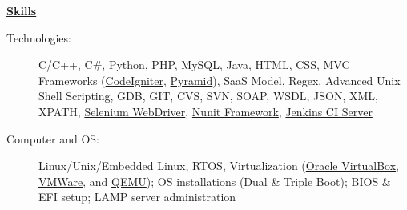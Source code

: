 \documentclass[letterpaper,11pt]{article}
\newcommand{\resheading}[1]{{\large \colorbox{mygrey}{\begin{minipage}{\textwidth}{\textbf{#1 \vphantom{p\^{E}}}}\end{minipage}}}}
\begin{document}
\resheading{\href{http://www.derekhildreth.com/portfolio.php}{Skills}}
	\begin{description}
		\item[Technologies:] { \footnotesize C/C++,
			C\#, Python, PHP, MySQL, Java, HTML, CSS,
			MVC Frameworks (\href{http://ellislab.com/codeigniter}{CodeIgniter}, \href{http://www.pylonsproject.org/}{Pyramid}), SaaS Model,
			Regex, Advanced Unix Shell Scripting, GDB,
			GIT, CVS, SVN, SOAP, WSDL, JSON, XML, XPATH,
			\href{http://seleniumhq.org/projects/webdriver/}{Selenium
			WebDriver}, \href{http://www.nunit.org/}{Nunit Framework},
			\href{http://jenkins-ci.org/}{Jenkins CI Server}
		}
		\item[Computer and OS:] { \footnotesize
			Linux/Unix/Embedded Linux, RTOS,
			Virtualization (\href{http://www.virtualbox.org}{Oracle
			VirtualBox}, \href{http://www.vmware.com}{VMWare},
			and \href{http://www.qemu.com}{QEMU}); OS installations
			(Dual \& Triple Boot);	BIOS \& EFI setup; LAMP server administration
		}



                   

\end{description}
\end{document}
